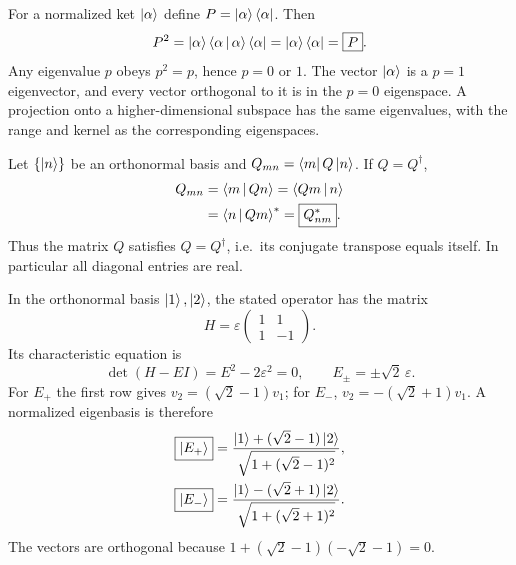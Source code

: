For a normalized ket $\left|\alpha\right\rangle$ define
$P=\left|\alpha\right\rangle\left\langle\alpha\right|$. Then
\begin{equation}
P^2=\left|\alpha\right\rangle\left\langle\alpha\,\middle|\,\alpha\right\rangle\left\langle\alpha\right|
=\left|\alpha\right\rangle\left\langle\alpha\right|=\boxed P.
\end{equation}
Any eigenvalue $p$ obeys $p^2=p$, hence
$p=0$ or $1$. The vector $\left|\alpha\right\rangle$
is a $p=1$ eigenvector, and every vector
orthogonal to it is in the $p=0$
eigenspace. A projection onto a
higher-dimensional subspace has the same
eigenvalues, with the range and kernel
as the corresponding eigenspaces.

Let $\{\left|n\right\rangle\}$ be an orthonormal basis and
$Q_{mn}=\left\langle m\right| Q\left|n\right\rangle$.
If $Q=Q^\dagger$,
\begin{align}
Q_{mn}&=\left\langle m\,\middle|\,Qn\right\rangle
=\left\langle Qm\,\middle|\,n\right\rangle\\
&=\left\langle n\,\middle|\,Qm\right\rangle^*
=\boxed{Q_{nm}^*}.
\end{align}
Thus the matrix $Q$ satisfies
$\boxed{Q=Q^\dagger}$, i.e.\ its
conjugate transpose equals itself.
In particular all diagonal entries are real.

In the orthonormal basis $\left|1\right\rangle,\left|2\right\rangle$,
the stated operator has the matrix
\begin{equation}
H=\varepsilon
\begin{pmatrix}1&1\\1&-1\end{pmatrix}.
\end{equation}
Its characteristic equation is
\begin{equation}
\det(H-EI)=E^2-2\varepsilon^2=0,
\qquad\boxed{E_\pm=\pm\sqrt2\,\varepsilon}.
\end{equation}
For $E_+$ the first row gives
$v_2=(\sqrt2-1)v_1$; for $E_-$,
$v_2=-(\sqrt2+1)v_1$.
A normalized eigenbasis is therefore
\begin{align}
\boxed{\left|E_+\right\rangle}&=
\frac{\left|1\right\rangle+(\sqrt2-1)\left|2\right\rangle}
{\sqrt{1+(\sqrt2-1)^2}},\\
\boxed{\left|E_-\right\rangle}&=
\frac{\left|1\right\rangle-(\sqrt2+1)\left|2\right\rangle}
{\sqrt{1+(\sqrt2+1)^2}}.
\end{align}
The vectors are orthogonal because
$1+(\sqrt2-1)(-\sqrt2-1)=0$.

